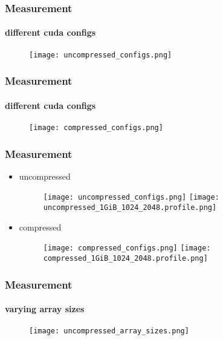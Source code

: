 \documentclass{beamer}
\begin{document}
\begin{frame}
    \frametitle{Measurement}
    \framesubtitle{different cuda configs}
       \begin{figure}
           \centering
           \texttt{[image: uncompressed\_configs.png]} %
       \end{figure}
\end{frame}

\begin{frame}
    \frametitle{Measurement}
    \framesubtitle{different cuda configs}
       \begin{figure}
           \centering
           \texttt{[image: compressed\_configs.png]} %
       \end{figure}
\end{frame}

\begin{frame}
    \frametitle{Measurement}
    \begin{itemize}
        \item uncompressed
         \begin{figure}
             \centering
             \texttt{[image: uncompressed\_configs.png]} %
             \texttt{[image: uncompressed\_1GiB\_1024\_2048.profile.png]} %
         \end{figure}

         \item compressed
         \begin{figure}
             \centering
             \texttt{[image: compressed\_configs.png]} %
             \texttt{[image: compressed\_1GiB\_1024\_2048.profile.png]} %
         \end{figure}
    \end{itemize}
\end{frame}

\begin{frame}
    \frametitle{Measurement}
    \framesubtitle{varying array sizes}
    \begin{figure}
        \centering
        \texttt{[image: uncompressed\_array\_sizes.png]} %
    \end{figure}
\end{frame}
\end{document}

